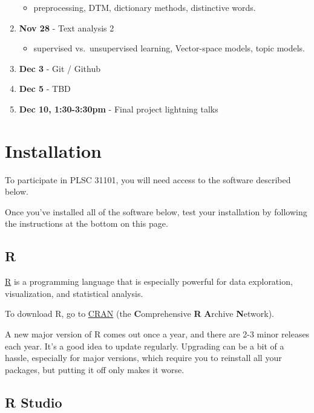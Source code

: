 \documentclass[]{book}
\providecommand{\tightlist}{%
  \setlength{\itemsep}{0pt}\setlength{\parskip}{0pt}}
\begin{document}
\begin{enumerate}
  \begin{itemize}
  \tightlist
  \item
    preprocessing, DTM, dictionary methods, distinctive words.
  \end{itemize}
\item
  \textbf{Nov 28} - Text analysis 2

  \begin{itemize}
  \tightlist
  \item
    supervised vs.~unsupervised learning, Vector-space models, topic models.
  \end{itemize}
\item
  \textbf{Dec 3} - Git / Github
\item
  \textbf{Dec 5} - TBD
\item
  \textbf{Dec 10, 1:30-3:30pm} - Final project lightning talks
\end{enumerate}

\hypertarget{installation}{%
\chapter{Installation}\label{installation}}

To participate in PLSC 31101, you will need access to the software described below.

Once you've installed all of the software below, test your installation by following the instructions at the bottom on this page.

\hypertarget{r}{%
\section{R}\label{r}}

\href{http://www.r-project.org/}{R} is a programming language that is especially powerful for data exploration, visualization, and statistical analysis.

To download R, go to \href{https://cran.r-project.org/}{CRAN} (the \textbf{C}omprehensive \textbf{R} \textbf{A}rchive \textbf{N}etwork).

A new major version of R comes out once a year, and there are 2-3 minor releases each year. It's a good idea to update regularly. Upgrading can be a bit of a hassle, especially for major versions, which require you to reinstall all your packages, but putting it off only makes it worse.

\hypertarget{r-studio}{%
\section{R Studio}\label{r-studio}}
\end{document}
